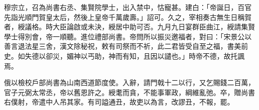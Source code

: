 \begin{pinyinscope}
 穆宗立，召為尚書右丞、集賢院學士，出入禁中，怙寵甚。建白：「帝誕日，百官先詣光順門賀皇太后，然後上皇帝千萬歲壽。」詔可。久之，宰相奏古無生日稱賀者，綬議格。時大臣論啟或未決，綬居中助可否。九月九日宴群臣曲江，綬請集賢學士得別會，帝一順聽。進位禮部尚書。帝問所以振災邀福者，對曰：「宋景公以善言退法星三舍，漢文除秘祝，敕有司祭而不祈，此二君皆受自至之福，書美前史。如失德以卻災，媚神以丐助，神而有知，且因以譴也。」時帝不德，故托諷焉。



 俄以檢校戶部尚書為山南西道節度使。入辭，請門戟十二以行，又乞賜錢二百萬，官子元弼太常丞，帝以舊恩許之。綬耄而貪，不能事軍政，綱維亂弛。卒，贈尚書右僕射，帝遣中人吊其家。有司謚通丑，故吏以為言，改謬丑，不報，罷。



\end{pinyinscope}